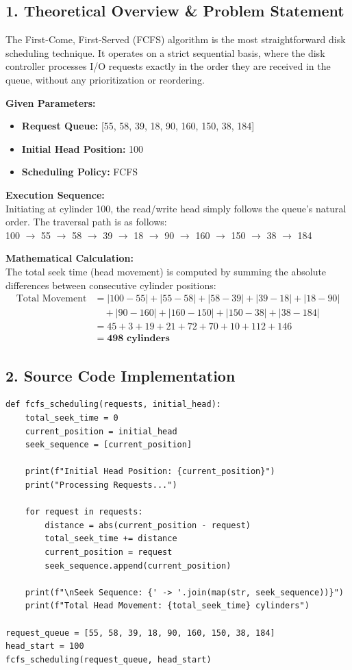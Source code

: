 \documentclass[12pt,a4paper]{article}
\begin{document}
\subsection*{1. Theoretical Overview \& Problem Statement}
The First-Come, First-Served (FCFS) algorithm is the most straightforward disk scheduling technique. It operates on a strict sequential basis, where the disk controller processes I/O requests exactly in the order they are received in the queue, without any prioritization or reordering.

\textbf{Given Parameters:}
\begin{itemize}
    \item \textbf{Request Queue:} [55, 58, 39, 18, 90, 160, 150, 38, 184]
    \item \textbf{Initial Head Position:} 100
    \item \textbf{Scheduling Policy:} FCFS
\end{itemize}

\textbf{Execution Sequence:} \\
Initiating at cylinder 100, the read/write head simply follows the queue's natural order. The traversal path is as follows: \\
100 $\rightarrow$ 55 $\rightarrow$ 58 $\rightarrow$ 39 $\rightarrow$ 18 $\rightarrow$ 90 $\rightarrow$ 160 $\rightarrow$ 150 $\rightarrow$ 38 $\rightarrow$ 184

\textbf{Mathematical Calculation:} \\
The total seek time (head movement) is computed by summing the absolute differences between consecutive cylinder positions:
\begin{align*}
\text{Total Movement} &= |100 - 55| + |55 - 58| + |58 - 39| + |39 - 18| + |18 - 90| \\
&\quad + |90 - 160| + |160 - 150| + |150 - 38| + |38 - 184| \\
&= 45 + 3 + 19 + 21 + 72 + 70 + 10 + 112 + 146 \\
&= \mathbf{498 \text{ cylinders}}
\end{align*}

\subsection*{2. Source Code Implementation}
\begin{lstlisting}
def fcfs_scheduling(requests, initial_head):
    total_seek_time = 0
    current_position = initial_head
    seek_sequence = [current_position]
    
    print(f"Initial Head Position: {current_position}")
    print("Processing Requests...")
    
    for request in requests:
        distance = abs(current_position - request)
        total_seek_time += distance
        current_position = request
        seek_sequence.append(current_position)
        
    print(f"\nSeek Sequence: {' -> '.join(map(str, seek_sequence))}")
    print(f"Total Head Movement: {total_seek_time} cylinders")

request_queue = [55, 58, 39, 18, 90, 160, 150, 38, 184]
head_start = 100
fcfs_scheduling(request_queue, head_start)
\end{lstlisting}
\end{document}

